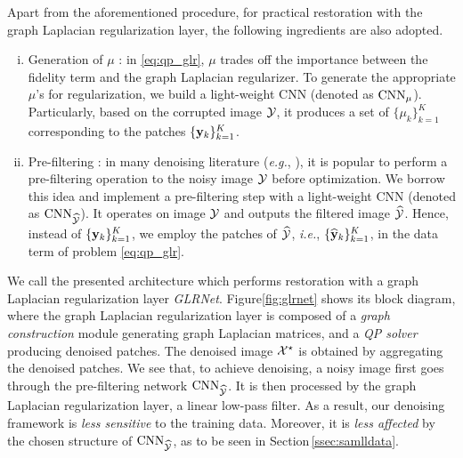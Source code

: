\documentclass[10pt,twocolumn,letterpaper]{article}
\begin{document}
Apart from the aforementioned procedure, for practical restoration with the graph Laplacian regularization layer, the following ingredients are also adopted.
\begin{enumerate}[(i)]
\item{Generation of $\mu$} : in \eqref{eq:qp_glr}, $\mu$ trades off the importance between the fidelity term and the graph Laplacian regularizer. 
To generate the appropriate $\mu$'s for regularization, we build a light-weight CNN (denoted as $\rm{CNN}_{\mu}$).
Particularly, based on the corrupted image ${\cal Y}$, it produces a set of $\{\mu_k\}_{k=1}^K$ corresponding to the patches $\{{\bf y}_k\}_{k=1}^K$. 
%
\item{Pre-filtering} : in many denoising literature ({\it e.g.}, \cite{milanfar2013tour,chatterjee2012patch,pang2015optimal}), it is popular to perform a pre-filtering operation to the noisy image ${\cal Y}$ before optimization. 
We borrow this idea and implement a pre-filtering step with a light-weight CNN (denoted as ${\rm CNN}_{\widehat{\cal Y}}$). 
It operates on image ${\cal Y}$ and outputs the filtered image ${\widehat{\cal Y}}$. 
Hence, instead of $\{{\bf y }_k\}_{k=1}^K$, we employ the patches of ${\widehat{\cal Y}}$, {\it i.e.}, $\{\widehat{{\bf y}}_k\}_{k=1}^K$, in the data term of problem \eqref{eq:qp_glr}.
%
\end{enumerate}

We call the presented architecture which performs restoration with a graph Laplacian regularization layer \emph{GLRNet}.
Figure\;\ref{fig:glrnet} shows its block diagram, where the graph Laplacian regularization layer is composed of a \emph{graph construction} module generating graph Laplacian matrices, and a \emph{QP solver} producing denoised patches. The denoised image ${\cal X}^{\star}$ is obtained by aggregating the denoised patches.
We see that, to achieve denoising, a noisy image first goes through the pre-filtering network ${\rm CNN}_{\widehat{\cal Y}}$. 
It is then processed by the graph Laplacian regularization layer, a linear low-pass filter.
As a result, our denoising framework is {\it less sensitive} to the training data. 
Moreover, it is \emph{less affected} by the chosen structure of ${\rm CNN}_{\widehat{\cal Y}}$, as to be seen in Section\,\ref{ssec:samlldata}.
\end{document}
